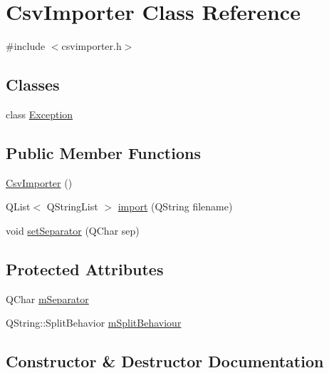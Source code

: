 \hypertarget{class_csv_importer}{}\section{Csv\+Importer Class Reference}
\label{class_csv_importer}


{\ttfamily \#include $<$csvimporter.\+h$>$}

\subsection*{Classes}
\begin{DoxyCompactItemize}
\item 
class \mbox{\hyperlink{class_csv_importer_1_1_exception}{Exception}}
\end{DoxyCompactItemize}
\subsection*{Public Member Functions}
\begin{DoxyCompactItemize}
\item 
\mbox{\hyperlink{class_csv_importer_a6d2ac2be11a2c25ac56430841cf7aa61}{Csv\+Importer}} ()
\item 
Q\+List$<$ Q\+String\+List $>$ \mbox{\hyperlink{class_csv_importer_a09efc986bbbdca32b8c47c665692b68e}{import}} (Q\+String filename)
\item 
void \mbox{\hyperlink{class_csv_importer_ae82aced25bbd9d0bbbb0842fcb26526d}{set\+Separator}} (Q\+Char sep)
\end{DoxyCompactItemize}
\subsection*{Protected Attributes}
\begin{DoxyCompactItemize}
\item 
Q\+Char \mbox{\hyperlink{class_csv_importer_a0a190acb1849e3555bea403a500677e6}{m\+Separator}}
\item 
Q\+String\+::\+Split\+Behavior \mbox{\hyperlink{class_csv_importer_a9b748dbedd138010aab54cc42892eb65}{m\+Split\+Behaviour}}
\end{DoxyCompactItemize}


\subsection{Constructor \& Destructor Documentation}
\mbox{\label{class_csv_importer_a6d2ac2be11a2c25ac56430841cf7aa61}} 

